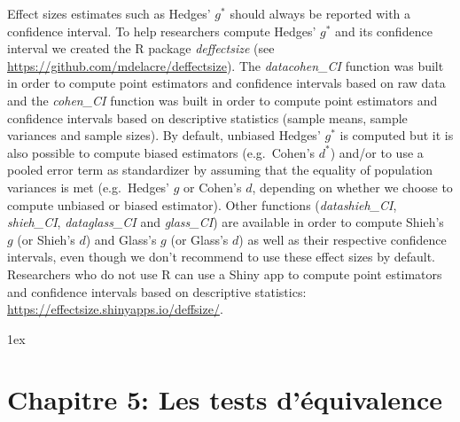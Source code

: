 \documentclass[
  12pt,
  french,
]{article}
\begin{document}
Effect sizes estimates such as Hedges' \(g^*\) should always be reported
with a confidence interval. To help researchers compute Hedges' \(g^*\)
and its confidence interval we created the R package \emph{deffectsize}
(see \url{https://github.com/mdelacre/deffectsize}). The
\emph{datacohen\_CI} function was built in order to compute point
estimators and confidence intervals based on raw data and the
\emph{cohen\_CI} function was built in order to compute point estimators
and confidence intervals based on descriptive statistics (sample means,
sample variances and sample sizes). By default, unbiased Hedges' \(g^*\)
is computed but it is also possible to compute biased estimators
(e.g.~Cohen's \(d^*\)) and/or to use a pooled error term as standardizer
by assuming that the equality of population variances is met
(e.g.~Hedges' \(g\) or Cohen's \(d\), depending on whether we choose to
compute unbiased or biased estimator). Other functions
(\emph{datashieh\_CI}, \emph{shieh\_CI}, \emph{dataglass\_CI} and
\emph{glass\_CI}) are available in order to compute Shieh's \(g\) (or
Shieh's \(d\)) and Glass's \(g\) (or Glass's \(d\)) as well as their
respective confidence intervals, even though we don't recommend to use
these effect sizes by default. Researchers who do not use R can use a
Shiny app to compute point estimators and confidence intervals based on
descriptive statistics: \url{https://effectsize.shinyapps.io/deffsize/}.

\begingroup
\parindent 0pt
\renewcommand\notesname{{\normalsize Note de fin de chapitre}}

\parskip 1ex \theendnotes \endgroup

\newpage

\hypertarget{chapitre-5-les-tests-duxe9quivalence}{%
\section{Chapitre 5: Les tests
d'équivalence}\label{chapitre-5-les-tests-duxe9quivalence}}
\end{document}
